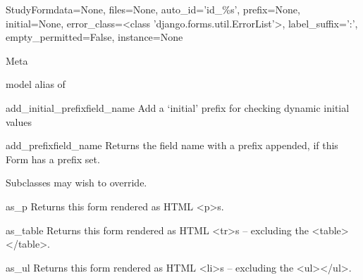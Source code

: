 \documentclass[letterpaper,10pt,english]{sphinxmanual}
\begin{document}
\hypertarget{data.forms.StudyForm}{}\begin{classdesc}{StudyForm}{data=None, files=None, auto\_id='id\_\%s', prefix=None, initial=None, error\_class=\textless{}class 'django.forms.util.ErrorList'\textgreater{}, label\_suffix=':', empty\_permitted=False, instance=None}~

\hypertarget{data.forms.StudyForm.Meta}{}\begin{classdesc}{Meta}{}~

\hypertarget{data.forms.StudyForm.Meta.model}{}\begin{memberdesc}{model}
alias of 
\end{memberdesc}
\end{classdesc}

\hypertarget{data.forms.StudyForm.add_initial_prefix}{}\begin{methoddesc}[StudyForm]{add\_initial\_prefix}{field\_name}
Add a `initial' prefix for checking dynamic initial values
\end{methoddesc}

\hypertarget{data.forms.StudyForm.add_prefix}{}\begin{methoddesc}[StudyForm]{add\_prefix}{field\_name}
Returns the field name with a prefix appended, if this Form has a
prefix set.

Subclasses may wish to override.
\end{methoddesc}

\hypertarget{data.forms.StudyForm.as_p}{}\begin{methoddesc}[StudyForm]{as\_p}{}
Returns this form rendered as HTML \textless{}p\textgreater{}s.
\end{methoddesc}

\hypertarget{data.forms.StudyForm.as_table}{}\begin{methoddesc}[StudyForm]{as\_table}{}
Returns this form rendered as HTML \textless{}tr\textgreater{}s -- excluding the \textless{}table\textgreater{}\textless{}/table\textgreater{}.
\end{methoddesc}

\hypertarget{data.forms.StudyForm.as_ul}{}\begin{methoddesc}[StudyForm]{as\_ul}{}
Returns this form rendered as HTML \textless{}li\textgreater{}s -- excluding the \textless{}ul\textgreater{}\textless{}/ul\textgreater{}.
\end{methoddesc}


\end{classdesc}
\end{document}
